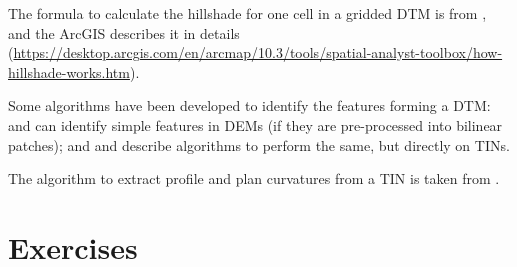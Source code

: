 The formula to calculate the hillshade for one cell in a gridded DTM is from \citet{Burrough98}, and the ArcGIS describes it in details (\url{https://desktop.arcgis.com/en/arcmap/10.3/tools/spatial-analyst-toolbox/how-hillshade-works.htm}).

Some algorithms have been developed to identify the features forming a DTM: \citet{Kweon94} and \citet{Schneider05} can identify simple features in DEMs (if they are pre-processed into bilinear patches); and \citet{Magillo09} and \citet{Edelsbrunner01-1} describe algorithms to perform the same, but directly on TINs.

The algorithm to extract profile and plan curvatures from a TIN is taken from \citet{vanKreveld97}.




%
\section{Exercises}

